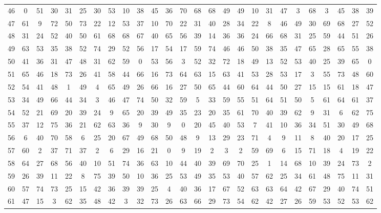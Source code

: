 \begin{table}
\begin{tabular}{c c c c c c c c c c c c c c c c c c c c c c c c c c }
46 & 0 & 51 & 30 & 31 & 25 & 30 & 53 & 10 & 38 & 45 & 36 & 70 & 68 & 68 & 49 & 49 & 10 & 31 & 47 & 3 & 68 & 3 & 45 & 38 & 39 \\
47 & 61 & 9 & 72 & 50 & 73 & 22 & 12 & 53 & 37 & 10 & 70 & 22 & 31 & 40 & 28 & 34 & 22 & 8 & 46 & 49 & 30 & 69 & 68 & 27 & 52 \\
48 & 31 & 24 & 52 & 40 & 50 & 61 & 68 & 68 & 67 & 40 & 65 & 56 & 39 & 14 & 36 & 36 & 24 & 66 & 68 & 31 & 25 & 59 & 44 & 51 & 26 \\
49 & 63 & 53 & 35 & 38 & 52 & 74 & 29 & 52 & 56 & 17 & 54 & 17 & 59 & 74 & 46 & 46 & 50 & 38 & 35 & 47 & 65 & 28 & 65 & 55 & 38 \\
50 & 41 & 36 & 31 & 47 & 48 & 31 & 62 & 59 & 0 & 53 & 56 & 3 & 52 & 32 & 72 & 18 & 49 & 13 & 52 & 53 & 40 & 25 & 39 & 65 & 0 \\
51 & 65 & 46 & 18 & 73 & 26 & 41 & 58 & 44 & 66 & 16 & 73 & 64 & 63 & 15 & 63 & 41 & 53 & 28 & 53 & 17 & 3 & 55 & 73 & 48 & 60 \\
52 & 54 & 41 & 48 & 1 & 49 & 4 & 65 & 49 & 26 & 66 & 16 & 27 & 50 & 65 & 44 & 60 & 64 & 44 & 50 & 27 & 15 & 15 & 61 & 18 & 47 \\
53 & 34 & 49 & 66 & 44 & 34 & 3 & 46 & 47 & 74 & 50 & 32 & 59 & 5 & 33 & 59 & 55 & 51 & 64 & 51 & 50 & 5 & 61 & 64 & 61 & 37 \\
54 & 52 & 21 & 69 & 20 & 39 & 24 & 9 & 65 & 20 & 39 & 49 & 35 & 23 & 20 & 35 & 61 & 70 & 40 & 39 & 62 & 9 & 31 & 6 & 62 & 75 \\
55 & 37 & 12 & 75 & 36 & 21 & 62 & 63 & 36 & 9 & 30 & 9 & 0 & 20 & 45 & 40 & 53 & 7 & 41 & 10 & 36 & 34 & 51 & 30 & 49 & 68 \\
56 & 6 & 40 & 70 & 58 & 6 & 25 & 20 & 67 & 49 & 68 & 50 & 48 & 9 & 13 & 29 & 23 & 71 & 4 & 9 & 11 & 8 & 40 & 20 & 17 & 25 \\
57 & 60 & 2 & 37 & 71 & 37 & 2 & 6 & 29 & 16 & 21 & 0 & 9 & 19 & 2 & 3 & 2 & 59 & 69 & 6 & 15 & 71 & 18 & 4 & 19 & 22 \\
58 & 64 & 27 & 68 & 56 & 40 & 10 & 51 & 74 & 36 & 63 & 10 & 44 & 40 & 39 & 69 & 70 & 25 & 1 & 14 & 68 & 10 & 39 & 24 & 73 & 2 \\
59 & 26 & 39 & 11 & 22 & 8 & 75 & 39 & 50 & 10 & 36 & 25 & 53 & 49 & 35 & 53 & 40 & 57 & 62 & 25 & 34 & 61 & 48 & 75 & 11 & 31 \\
60 & 57 & 74 & 73 & 25 & 15 & 42 & 36 & 39 & 39 & 25 & 4 & 40 & 36 & 17 & 67 & 52 & 63 & 63 & 64 & 42 & 67 & 29 & 40 & 74 & 51 \\
61 & 47 & 15 & 3 & 62 & 35 & 48 & 42 & 3 & 32 & 73 & 26 & 63 & 66 & 29 & 73 & 54 & 62 & 42 & 27 & 26 & 59 & 53 & 52 & 53 & 62 \\

\end{tabular}
\end{table}
